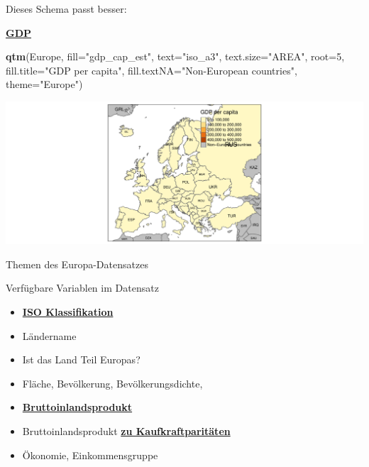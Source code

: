 \documentclass[ignorenonframetext,]{beamer}
\newenvironment{Shaded}{\begin{snugshade}}{\end{snugshade}}
\newcommand{\DataTypeTok}[1]{\textcolor[rgb]{0.13,0.29,0.53}{#1}}
\newcommand{\DecValTok}[1]{\textcolor[rgb]{0.00,0.00,0.81}{#1}}
\newcommand{\KeywordTok}[1]{\textcolor[rgb]{0.13,0.29,0.53}{\textbf{#1}}}
\newcommand{\NormalTok}[1]{#1}
\newcommand{\StringTok}[1]{\textcolor[rgb]{0.31,0.60,0.02}{#1}}
\providecommand{\tightlist}{%
  \setlength{\itemsep}{0pt}\setlength{\parskip}{0pt}}
\begin{document}
\begin{frame}[fragile]{Dieses Schema passt besser:}
\protect\hypertarget{dieses-schema-passt-besser}{}

\begin{block}{\href{https://en.wikipedia.org/wiki/Population_density}{\textbf{GDP}}}

\begin{Shaded}
\begin{Highlighting}[]
\KeywordTok{qtm}\NormalTok{(Europe, }\DataTypeTok{fill=}\StringTok{"gdp_cap_est"}\NormalTok{, }\DataTypeTok{text=}\StringTok{"iso_a3"}\NormalTok{, }
    \DataTypeTok{text.size=}\StringTok{"AREA"}\NormalTok{, }\DataTypeTok{root=}\DecValTok{5}\NormalTok{, }\DataTypeTok{fill.title=}\StringTok{"GDP per capita"}\NormalTok{, }
    \DataTypeTok{fill.textNA=}\StringTok{"Non-European countries"}\NormalTok{, }\DataTypeTok{theme=}\StringTok{"Europe"}\NormalTok{)}
\end{Highlighting}
\end{Shaded}

\includegraphics{A4_tmap_files/figure-beamer/unnamed-chunk-11-1.pdf}

\end{block}

\end{frame}

\begin{frame}{Themen des Europa-Datensatzes}
\protect\hypertarget{themen-des-europa-datensatzes}{}

\begin{block}{Verfügbare Variablen im Datensatz}

\begin{itemize}
\tightlist
\item
  \href{http://userpage.chemie.fu-berlin.de/diverse/doc/ISO_3166.html}{\textbf{ISO
  Klassifikation}}
\item
  Ländername
\item
  Ist das Land Teil Europas?
\item
  Fläche, Bevölkerung, Bevölkerungsdichte,
\item
  \href{https://en.wikipedia.org/wiki/Gross_domestic_product}{\textbf{Bruttoinlandsprodukt}}
\item
  Bruttoinlandsprodukt
  \href{https://en.wikipedia.org/wiki/List_of_countries_by_GDP_\%28PPP\%29_per_capita}{\textbf{zu
  Kaufkraftparitäten}}
\item
  Ökonomie, Einkommensgruppe
\end{itemize}

\end{block}

\end{frame}
\end{document}
